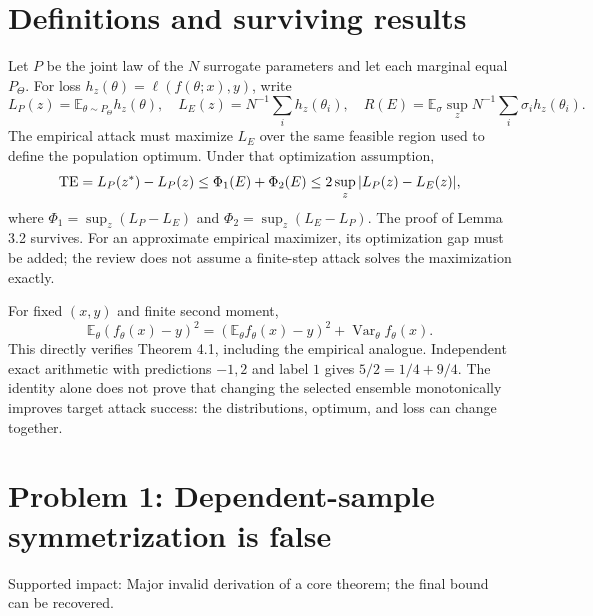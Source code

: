 \documentclass[10pt]{article}
\begin{document}
\section*{Definitions and surviving results}
Let \(P\) be the joint law of the \(N\) surrogate parameters and let each marginal equal \(P_\Theta\). For loss \(h_z(\theta)=\ell(f(\theta;x),y)\), write \[L_P(z)=\mathbb E_{\theta\sim P_\Theta}h_z(\theta),\quad
 L_E(z)=N^{-1}\sum_i h_z(\theta_i),\quad
 R(E)=\mathbb E_\sigma\sup_z N^{-1}\sum_i\sigma_i h_z(\theta_i).\] The empirical attack must maximize \(L_E\) over the same feasible region used to define the population optimum. Under that optimization assumption, \[{\rm TE}=L_P(z^*)-L_P(z)
 \le \Phi_1(E)+\Phi_2(E)\le2\sup_z|L_P(z)-L_E(z)|,\] where \(\Phi_1=\sup_z(L_P-L_E)\) and \(\Phi_2=\sup_z(L_E-L_P)\). The proof of Lemma 3.2 survives. For an approximate empirical maximizer, its optimization gap must be added; the review does not assume a finite-step attack solves the maximization exactly.\par
For fixed \((x,y)\) and finite second moment, \[\mathbb E_\theta(f_\theta(x)-y)^2
  =(\mathbb E_\theta f_\theta(x)-y)^2+\operatorname{Var}_\theta f_\theta(x).\] This directly verifies Theorem 4.1, including the empirical analogue. Independent exact arithmetic with predictions \(-1,2\) and label \(1\) gives \(5/2=1/4+9/4\). The identity alone does not prove that changing the selected ensemble monotonically improves target attack success: the distributions, optimum, and loss can change together.\par
\section*{Problem 1: Dependent-sample symmetrization is false}
Supported impact: Major invalid derivation of a core theorem; the final bound can be recovered.\par
\end{document}
